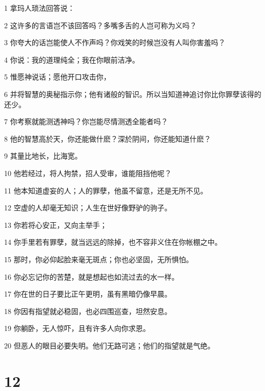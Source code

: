 \par 1 拿玛人琐法回答说：
\par 2 这许多的言语岂不该回答吗？多嘴多舌的人岂可称为义吗？
\par 3 你夸大的话岂能使人不作声吗？你戏笑的时候岂没有人叫你害羞吗？
\par 4 你说：我的道理纯全；我在你眼前洁净。
\par 5 惟愿神说话；愿他开口攻击你，
\par 6 并将智慧的奥秘指示你；他有诸般的智识。所以当知道神追讨你比你罪孽该得的还少。
\par 7 你考察就能测透神吗？你岂能尽情测透全能者吗？
\par 8 他的智慧高於天，你还能做什麽？深於阴间，你还能知道什麽？
\par 9 其量比地长，比海宽。
\par 10 他若经过，将人拘禁，招人受审，谁能阻挡他呢？
\par 11 他本知道虚妄的人；人的罪孽，他虽不留意，还是无所不见。
\par 12 空虚的人却毫无知识；人生在世好像野驴的驹子。
\par 13 你若将心安正，又向主举手；
\par 14 你手里若有罪孽，就当远远的除掉，也不容非义住在你帐棚之中。
\par 15 那时，你必仰起脸来毫无斑点；你也必坚固，无所惧怕。
\par 16 你必忘记你的苦楚，就是想起也如流过去的水一样。
\par 17 你在世的日子要比正午更明，虽有黑暗仍像早晨。
\par 18 你因有指望就必稳固，也必四围巡查，坦然安息。
\par 19 你躺卧，无人惊吓，且有许多人向你求恩。
\par 20 但恶人的眼目必要失明。他们无路可逃；他们的指望就是气绝。

\chapter{12}


